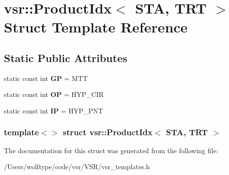 \hypertarget{structvsr_1_1_product_idx_3_01_s_t_a_00_01_t_r_t_01_4}{\section{vsr\-:\-:Product\-Idx$<$ S\-T\-A, T\-R\-T $>$ Struct Template Reference}
\label{structvsr_1_1_product_idx_3_01_s_t_a_00_01_t_r_t_01_4}
}
\subsection*{Static Public Attributes}
\begin{DoxyCompactItemize}
\item 
\hypertarget{structvsr_1_1_product_idx_3_01_s_t_a_00_01_t_r_t_01_4_a282a63d407e2e26d2872a452d201db3e}{static const int {\bfseries G\-P} = M\-T\-T}\label{structvsr_1_1_product_idx_3_01_s_t_a_00_01_t_r_t_01_4_a282a63d407e2e26d2872a452d201db3e}

\item 
\hypertarget{structvsr_1_1_product_idx_3_01_s_t_a_00_01_t_r_t_01_4_a5a1c30a7d13567561770a7ae06a3d971}{static const int {\bfseries O\-P} = H\-Y\-P\-\_\-\-C\-I\-R}\label{structvsr_1_1_product_idx_3_01_s_t_a_00_01_t_r_t_01_4_a5a1c30a7d13567561770a7ae06a3d971}

\item 
\hypertarget{structvsr_1_1_product_idx_3_01_s_t_a_00_01_t_r_t_01_4_a62f5d762da3233c32c7771c74f000e5e}{static const int {\bfseries I\-P} = H\-Y\-P\-\_\-\-P\-N\-T}\label{structvsr_1_1_product_idx_3_01_s_t_a_00_01_t_r_t_01_4_a62f5d762da3233c32c7771c74f000e5e}

\end{DoxyCompactItemize}
\subsubsection*{template$<$$>$ struct vsr\-::\-Product\-Idx$<$ S\-T\-A, T\-R\-T $>$}



The documentation for this struct was generated from the following file\-:\begin{DoxyCompactItemize}
\item 
/\-Users/wolftype/code/vsr/\-V\-S\-R/vsr\-\_\-templates.\-h\end{DoxyCompactItemize}
